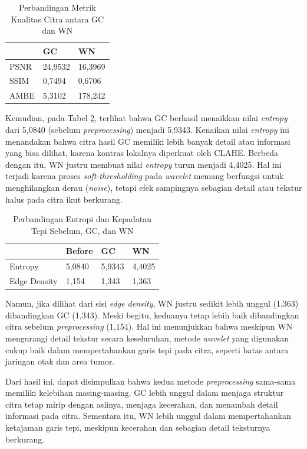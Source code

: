 \begin{table}[htbp]
	\centering
	\caption{Perbandingan Metrik Kualitas Citra antara GC dan WN}
	\label{tab:kualitas_gc_wn}
	\begin{tabular}{|l|l|l|}
		\hline
		& \textbf{GC} & \textbf{WN} \\ \hline
		PSNR & 24,9532 & 16,3969 \\ \hline
		SSIM & 0,7494 & 0,6706 \\ \hline
		AMBE & 5,3102 & 178,242 \\ \hline
	\end{tabular}
\end{table}

Kemudian, pada Tabel \ref{tab:entropi_edge_density}, terlihat bahwa GC berhasil menaikkan nilai \textit{entropy} dari 5,0840 (sebelum \textit{preprocessing}) menjadi 5,9343. Kenaikan nilai \textit{entropy} ini menandakan bahwa citra hasil GC memiliki lebih banyak detail atau informasi yang bisa dilihat, karena kontras lokalnya diperkuat oleh CLAHE. Berbeda dengan itu, WN justru membuat nilai \textit{entropy} turun menjadi 4,4025. Hal ini terjadi karena proses \textit{soft-thresholding} pada \textit{wavelet} memang berfungsi untuk menghilangkan derau (\textit{noise}), tetapi efek sampingnya sebagian detail atau tekstur halus pada citra ikut berkurang.

\begin{table}[htbp]
	\centering
	\caption{Perbandingan Entropi dan Kepadatan Tepi Sebelum, GC, dan WN}
	\label{tab:entropi_edge_density}
	\begin{tabular}{|l|l|l|l|}
		\hline
		& \textbf{Before} & \textbf{GC} & \textbf{WN} \\ \hline
		Entropy & 5,0840 & 5,9343 & 4,4025 \\ \hline
		Edge Density & 1,154 & 1,343 & 1,363 \\ \hline
	\end{tabular}
\end{table}

Namun, jika dilihat dari sisi \textit{edge density}, WN justru sedikit lebih unggul (1,363) dibandingkan GC (1,343). Meski begitu, keduanya tetap lebih baik dibandingkan citra sebelum \textit{preprocessing} (1,154). Hal ini menunjukkan bahwa meskipun WN mengurangi detail tekstur secara keseluruhan, metode \textit{wavelet} yang digunakan cukup baik dalam mempertahankan garis tepi pada citra, seperti batas antara jaringan otak dan area tumor.

Dari hasil ini, dapat disimpulkan bahwa kedua metode \textit{preprocessing} sama-sama memiliki kelebihan masing-masing. GC lebih unggul dalam menjaga struktur citra tetap mirip dengan aslinya, menjaga kecerahan, dan menambah detail informasi pada citra. Sementara itu, WN lebih unggul dalam mempertahankan ketajaman garis tepi, meskipun kecerahan dan sebagian detail teksturnya berkurang.

